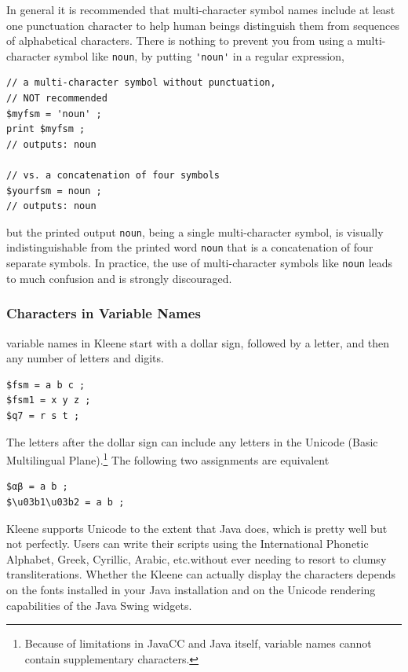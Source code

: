 In general it is recommended that multi-character symbol names include at least
one punctuation character to help human beings distinguish them from sequences of
alphabetical characters.  There is nothing to prevent you from using a
multi-character symbol like \texttt{noun}, by putting \verb!'noun'! in a regular
expression,


\begin{Verbatim}
// a multi-character symbol without punctuation, 
// NOT recommended
$myfsm = 'noun' ;
print $myfsm ;
// outputs: noun

// vs. a concatenation of four symbols
$yourfsm = noun ;
// outputs: noun
\end{Verbatim}

\noindent
but the printed output \texttt{noun}, being a single multi-character symbol,
is visually indistinguishable from the printed word \texttt{noun}
that is a concatenation of four separate symbols.  In practice, the use of
multi-character symbols like \verb'noun' leads to much confusion and is
strongly discouraged.  

\subsubsection{Characters in Variable Names}

\fsm{} variable names in Kleene start with a dollar sign, followed by a letter, and then any number of
letters and digits.


\begin{Verbatim}
$fsm = a b c ;
$fsm1 = x y z ;
$q7 = r s t ;
\end{Verbatim}

\noindent
The letters after the dollar sign can include any letters in the Unicode  (Basic
Multilingual Plane).\footnote{Because of limitations in JavaCC and Java itself, variable
names cannot contain supplementary characters.}  The following two assignments are equivalent 


\begin{Verbatim}
$αβ = a b ;
$\u03b1\u03b2 = a b ;
\end{Verbatim}

Kleene supports Unicode to the extent that Java does, which is pretty well but not
perfectly.  Users can write their scripts using the International Phonetic Alphabet, Greek,
Cyrillic, Arabic, etc.\@ without ever needing to resort to clumsy transliterations.
Whether the Kleene \gui{} can actually display the characters depends on the fonts installed in
your Java installation and on the Unicode rendering capabilities of the
Java Swing widgets.

